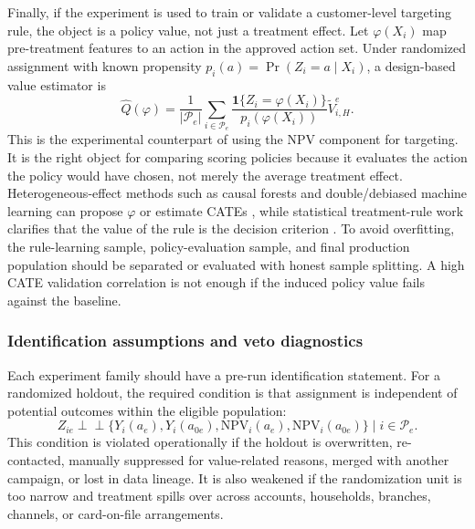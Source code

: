 \documentclass[11pt]{article}
\newcommand{\NPV}{\mathrm{NPV}}
\newcommand{\1}{\mathbf{1}}
\begin{document}
Finally, if the experiment is used to train or validate a customer-level
targeting rule, the object is a policy value, not just a treatment effect.
Let $\varphi(X_i)$ map pre-treatment features to an action in the approved
action set. Under randomized assignment with known propensity
$p_i(a)=\Pr(Z_i=a\mid X_i)$, a design-based value estimator is
\begin{equation}
  \widehat{Q}(\varphi)
  =
  \frac{1}{|\mathcal{P}_e|}
  \sum_{i\in\mathcal{P}_e}
  \frac{\1\{Z_i=\varphi(X_i)\}}
       {p_i(\varphi(X_i))}
  \widetilde{V}^{e}_{i,H}.
  \label{eq:policy-value-estimator}
\end{equation}
This is the experimental counterpart of using the NPV component for targeting.
It is the right object for comparing scoring policies because it evaluates the
action the policy would have chosen, not merely the average treatment effect.
Heterogeneous-effect methods such as causal forests and double/debiased
machine learning can propose $\varphi$ or estimate CATEs
\citep{wager2018causalforests,chernozhukov2018dml}, while statistical
treatment-rule work clarifies that the value of the rule is the decision
criterion \citep{manski2004treatment}. To avoid overfitting, the rule-learning
sample, policy-evaluation sample, and final production population should be
separated or evaluated with honest sample splitting. A high CATE validation
correlation is not enough if the induced policy value fails against the
baseline.

\subsubsection{Identification assumptions and veto diagnostics}

Each experiment family should have a pre-run identification statement. For a
randomized holdout, the required condition is that assignment is independent of
potential outcomes within the eligible population:
\begin{equation}
  Z_{ie}
  \perp\!\!\!\perp
  \{Y_i(a_e),Y_i(a_{0e}),\NPV_i(a_e),\NPV_i(a_{0e})\}
  \mid i\in\mathcal{P}_e.
  \label{eq:randomization-assumption}
\end{equation}
This condition is violated operationally if the holdout is overwritten,
re-contacted, manually suppressed for value-related reasons, merged with
another campaign, or lost in data lineage. It is also weakened if the
randomization unit is too narrow and treatment spills over across accounts,
households, branches, channels, or card-on-file arrangements.
\end{document}
